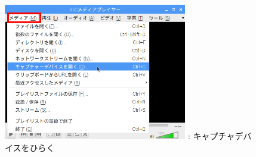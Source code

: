 \documentclass[a4paper,12pt]{jarticle}
\begin{document}
\begin{figure}[ht]
  \centering
  \begin{minipage}{8.096cm}
    {\upshape
      \includegraphics[width=8.0cm]{textbook-img116.png}
      \newline
      {\theFigure\label{seq:refFigure22}}:
      キャプチャデバイスをひらく}
  \end{minipage}
\end{figure}
\clearpage
\end{document}
